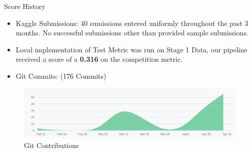 \documentclass[final]{beamer}
\newlength{\restofpage}
\begin{document}
\begin{frame}[t]
\begin{columns}[t]
\begin{column}{\restofpage}
\begin{columns}[c]
        \begin{block}{Score History}
          \begin{itemize}
            \item Kaggle Submissions: 40 sumissions entered uniformly
                throughout the past 3 months. No successful submissions other
                than provided sample submissions.
            \item Local implementation of Test Metric was run on Stage 1 Data,
                our pipeline received a score of a \textbf{0.316} on the
                competition metric.
            \item Git Commits: (176 Commits)
          \end{itemize}
              \begin{figure}
                  \centering
                  \includegraphics[width=\textwidth]{./figs/commit_graph.png}
                  \caption{Git Contributions}
              \end{figure}
        \end{block}


\end{columns}
\end{column}
\end{columns}
\end{frame}
\end{document}
